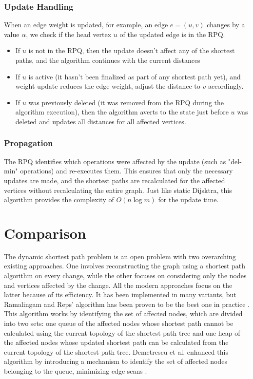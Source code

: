\documentclass[12pt]{article}
\begin{document}
\subsubsection*{Update Handling}
When an edge weight is updated, for example, an edge $e=(u,v)$ changes by a value $\alpha$, we check if the head vertex $u$ of the updated edge is in the RPQ. 
\begin{itemize}
    \item If $u$ is not in the RPQ, then the update doesn’t affect any of the shortest paths, and the algorithm continues with the current distances
\item If $u$ is active (it hasn’t been finalized as part of any shortest path yet), and weight update reduces the edge weight, adjust the distance to $v$ accordingly.
\item If $u$ was previously deleted (it was removed from the RPQ during the algorithm execution), then the algorithm averts to the state just before $u$ was deleted and updates all distances for all affected vertices.

\end{itemize}

\subsubsection*{Propagation}
The RPQ identifies which operations were affected by the update (such as "del-min" operations) and re-executes them. This ensures that only the necessary updates are made, and the shortest paths are recalculated for the affected vertices without recalculating the entire graph. Just like static Dijsktra, this algorithm provides the complexity of $O(n \log m)$ for the update time.



\section*{Comparison}
The dynamic shortest path problem is an open problem with two overarching existing approaches. One involves reconstructing the graph using a shortest path algorithm on every change, while the other focuses on considering only the nodes and vertices affected by the change. All the modern approaches focus on the latter because of its efficiency. It has been implemented in many variants, but Ramalingam and Reps' algorithm \cite{ramalingam1996computational}\cite{ramalingam1996incremental} has been proven to be the best one in practice \cite{buriol2003speeding}\cite{demetrescu2006experimental}. This algorithm works by identifying the set of affected nodes, which are divided into two sets: one queue of the affected nodes whose shortest path cannot be calculated using the current topology of the shortest path tree 
 and one heap of the affected nodes whose updated shortest path can be calculated from the current topology of the shortest path tree. Demetrescu et al. enhanced this algorithm by introducing a mechanism to identify the set of affected nodes belonging to the queue, minimizing edge scans \cite{demetrescu2003new}.
\end{document}
